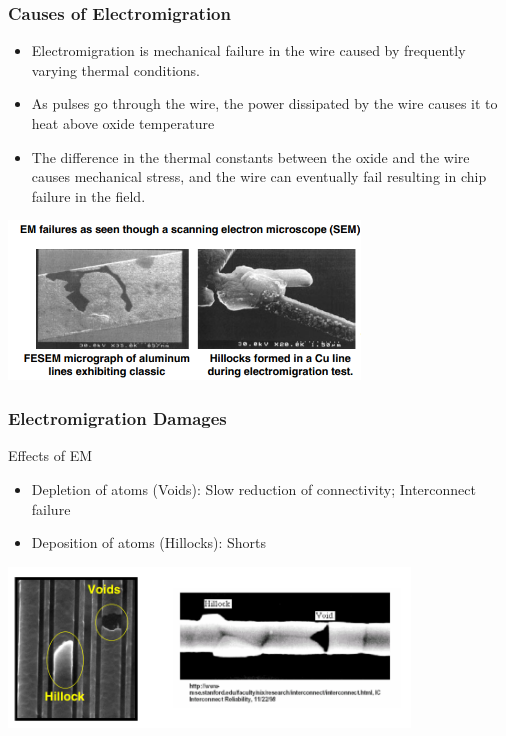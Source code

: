 \documentclass{beamer}
\begin{document}
	\begin{frame}
		\frametitle{Causes of Electromigration}
			\begin{itemize}
				\item Electromigration is mechanical failure in the wire caused by frequently varying
				thermal conditions.
				\item As pulses go through the wire, the power dissipated by the wire causes it to
				heat above oxide temperature
				\item The difference in the thermal constants between the oxide and the wire
				causes mechanical stress, and the wire can eventually fail resulting in chip
				failure in the field.
			\end{itemize}
	
\begin{center}
	\includegraphics[width=0.7\textwidth]{em2}
\end{center}
	\end{frame}
	
	\begin{frame}
		\frametitle{Electromigration Damages}

	\begin{alertblock}{Effects of EM}
		\begin{itemize}
			\item Depletion of atoms (Voids): Slow reduction of connectivity; Interconnect failure
			\item Deposition of atoms (Hillocks): Shorts
		\end{itemize}
	\end{alertblock}
	\begin{center}
		\includegraphics[width=0.8\textwidth]{em3}
	\end{center}
\end{frame}
	
\end{document}
